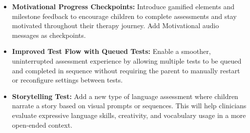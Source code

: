 \documentclass{article}
\begin{document}
\begin{itemize}
    \item \textbf{Motivational Progress Checkpoints:} Introduce gamified elements and milestone feedback to encourage children to complete assessments and stay motivated throughout their therapy journey. Add Motivational audio messages as checkpoints.

    \item \textbf{Improved Test Flow with Queued Tests:} Enable a smoother, uninterrupted assessment experience by allowing multiple tests to be queued and completed in sequence without requiring the parent to manually restart or reconfigure settings between tests.

    \item \textbf{Storytelling Test:} Add a new type of language assessment where children narrate a story based on visual prompts or sequences. This will help clinicians evaluate expressive language skills, creativity, and vocabulary usage in a more open-ended context.
\end{itemize}
\end{document}
